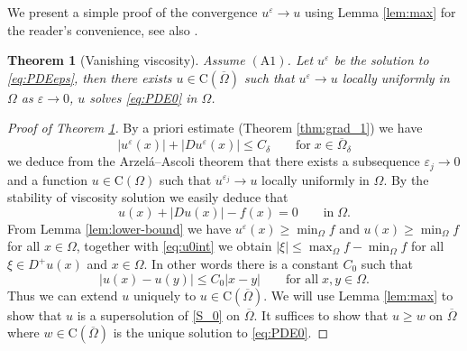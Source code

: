 \documentclass[11pt,reqno]{amsart}
\numberwithin{figure}{section}
\theoremstyle{plain}
\newtheorem{thm}{Theorem}[section]
\theoremstyle{remark}
\numberwithin{equation}{section}
\newcommand{\rmC}{\mathrm{C}}
\begin{document}
We present a simple proof of the convergence $u^\varepsilon \to u$ using Lemma \ref{lem:max} for the reader's convenience, see also \cite[Theorem VII.3]{Capuzzo-Dolcetta1990}.
\begin{thm}[Vanishing viscosity]\label{thm:qual} Assume $\mathrm{(A1)}$. Let $u^\varepsilon$ be the solution to \eqref{eq:PDEeps}, then there exists $u \in \mathrm{C}(\overline{\Omega})$ such that $u^\varepsilon \rightarrow u$ locally uniformly in $\Omega$ as $\varepsilon\rightarrow 0$, $u$ solves \eqref{eq:PDE0} in $\Omega$.
\end{thm}

\begin{proof}[Proof of Theorem \ref{thm:qual}] By a priori estimate (Theorem \ref{thm:grad_1}) we have
\begin{equation}\label{e:priorie_eps}
    |u^\varepsilon(x)| + |Du^\varepsilon(x)| \leq C_\delta \qquad\text{for}\;x\in \overline{\Omega}_\delta
\end{equation}
we deduce from the Arzel\'a--Ascoli theorem that there exists a subsequence $\varepsilon_j\to 0$ and a function $u\in \rmC(\Omega)$ such that $u^{\varepsilon_j}\to u$ locally uniformly in $\Omega$. By the stability of viscosity solution we easily deduce that 
\begin{equation}\label{eq:u0int}
     u(x) + |Du(x)| - f(x) = 0 \qquad\text{in}\;\Omega.
\end{equation}
From Lemma \ref{lem:lower-bound} we have $  u^\varepsilon(x)\geq \min_{\Omega} f$ and  $  u(x)\geq \min_{\Omega} f$ for all $x\in \Omega$, together with \eqref{eq:u0int} we obtain $|\xi|\leq \max_\Omega f - \min_\Omega f$ for all $\xi\in D^+u(x)$ and $x\in \Omega$. In other words there is a constant $C_0$ such that
\begin{equation}\label{e:C0}
    |u(x) - u(y)| \leq C_0|x-y| \qquad\text{for all}\;x,y\in \Omega.
\end{equation}
Thus we can extend $u$ uniquely to $u\in \rmC(\overline{\Omega})$. We will use Lemma \ref{lem:max} to show that $u$ is a supersolution of \eqref{S_0} on $\overline{\Omega}$. It suffices to show that $u\geq w$ on $\overline{\Omega}$ where $w\in \rmC(\overline{\Omega})$ is the unique solution to \eqref{eq:PDE0}.


\end{proof}
\end{document}
